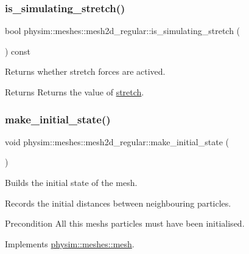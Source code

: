 \subsubsection{\texorpdfstring{is\+\_\+simulating\+\_\+stretch()}{is\_simulating\_stretch()}}
{\footnotesize\ttfamily bool physim\+::meshes\+::mesh2d\+\_\+regular\+::is\+\_\+simulating\+\_\+stretch (\begin{DoxyParamCaption}{ }\end{DoxyParamCaption}) const}



Returns whether stretch forces are actived. 

\begin{DoxyReturn}{Returns}
Returns the value of \hyperlink{classphysim_1_1meshes_1_1mesh2d__regular_a3101edd8212afd9a35ad11c6666e26be}{stretch}. 
\end{DoxyReturn}
\mbox{\label{classphysim_1_1meshes_1_1mesh2d__regular_ab05d404566850dd5a2d11814c3c25186}} 
\subsubsection{\texorpdfstring{make\+\_\+initial\+\_\+state()}{make\_initial\_state()}}
{\footnotesize\ttfamily void physim\+::meshes\+::mesh2d\+\_\+regular\+::make\+\_\+initial\+\_\+state (\begin{DoxyParamCaption}{ }\end{DoxyParamCaption})\hspace{0.3cm}{\ttfamily [virtual]}}



Builds the initial state of the mesh. 

Records the initial distances between neighbouring particles.

\begin{DoxyPrecond}{Precondition}
All this mesh\textquotesingle{}s particles must have been initialised. 
\end{DoxyPrecond}


Implements \hyperlink{classphysim_1_1meshes_1_1mesh_a62f877dd42bc306ef70c76fc172f245f}{physim\+::meshes\+::mesh}.

